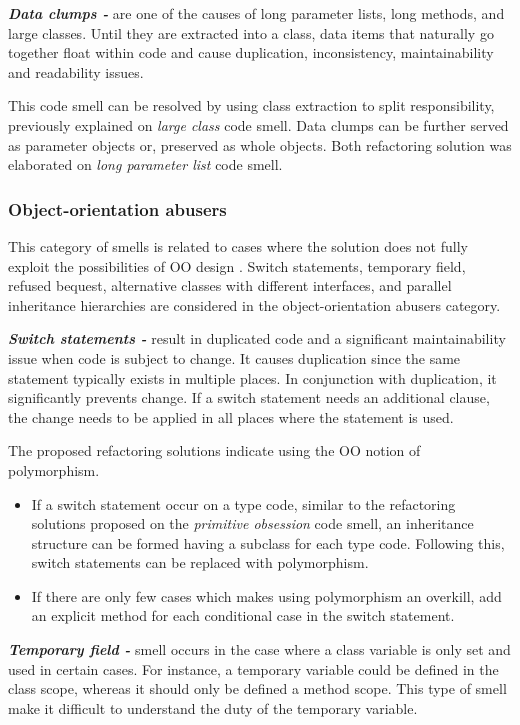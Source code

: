 \textit{\textbf{Data clumps -}} are one of the causes of long parameter lists, long methods, and large classes. Until they are extracted into a class, data items that naturally go together float within code and cause duplication, inconsistency, maintainability and readability issues.

This code smell can be resolved by using class extraction to split responsibility, previously explained on \textit{large class} code smell. Data clumps can be further served as parameter objects or, preserved as whole objects. Both refactoring solution was elaborated on \textit{long parameter list} code smell.

\subsubsection*{Object-orientation abusers}
This category of smells is related to cases where the solution does not fully exploit the possibilities of \gls{OO} design \cite{mantylaTaxonomy}. Switch statements, temporary field, refused bequest, alternative classes with different interfaces, and parallel inheritance hierarchies are considered in the object-orientation abusers category. 

\textit{\textbf{Switch statements -}} result in duplicated code and a significant maintainability issue when code is subject to change. It causes duplication since the same statement typically exists in multiple places. In conjunction with duplication, it significantly prevents change. If a switch statement needs an additional clause, the change needs to be applied in all places where the statement is used.

The proposed refactoring solutions \cite{fowlerRefactor} indicate using the \gls{OO} notion of polymorphism.

\begin{itemize}
\item If a switch statement occur on a type code, similar to the refactoring solutions proposed on the \textit{primitive obsession} code smell, an inheritance structure can be formed having a subclass for each type code. Following this, switch statements can be replaced with polymorphism.
\item If there are only few cases which makes using polymorphism an overkill, add an explicit method for each conditional case in the switch statement.
\end{itemize}

\textit{\textbf{Temporary field -}} smell occurs in the case where a class variable is only set and used in certain cases. For instance, a temporary variable could be defined in the class scope, whereas it should only be defined a method scope. This type of smell make it difficult to understand the duty of the temporary variable. 

